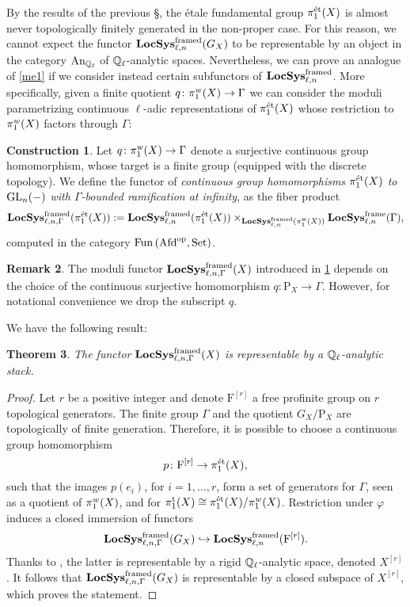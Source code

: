 \documentclass[10pt,a4paper]{amsart}
\numberwithin{equation}{subsection}
\theoremstyle{plain}
\newtheorem{theorem}{Theorem}[section]
\theoremstyle{definition}
\newtheorem{rema}[theorem]{Remark}
\newtheorem{construction}[theorem]{Construction}
\theoremstyle{remark}
\numberwithin{equation}{section}
\begin{document}
By the results of the previous \S, the \'etale fundamental group $\pi_1^{\text{\'et}}(X)$ is almost never topologically finitely generated
in the non-proper case. For this reason, we cannot expect the functor $\mathbf{LocSys}_{\ell, n}^{\mathrm{framed}}(G_X) $ to be representable by an object in the category $\mathrm{An}_{\mathbb{Q}_\ell}$ of $\mathbb{Q}_\ell$-analytic spaces.
Nevertheless,
we can prove an analogue of \cref{me1} if we consider instead certain subfunctors of $\mathbf{LocSys}_{\ell, n}^{\mathrm{framed}}$. More specifically, given a finite
quotient $q \colon \pi_1^w(X) \to \Gamma$ we can consider the moduli parametrizing continuous $\ell$-adic representations of $\pi_1^{\text{\'et}}(X)$
whose restriction to $\pi_1^w(X)$ factors through $\Gamma$:

\begin{construction} \label{const1}
Let $q \colon \mathrm {\pi_1^w}(X) \to \Gamma$ denote a surjective continuous group homomorphism, whose target is a finite group (equipped with the discrete topology). We define the functor of \emph{continuous group homomorphisms $\pi_1^{\text{\'et}}(X)$ to $\mathrm{GL}_n(-)$
with $\Gamma$-bounded ramification at infinity}, as the fiber product
	\begin{equation} \label{eq_def}
		\mathbf{LocSys}_{\ell, n, \Gamma}^{\mathrm{framed}}(\pi_1^{\text{\'et}}(X)): =  \mathbf{LocSys}_{\ell, n}^{\mathrm{framed}}(\pi_1^{\text{\'et}}(X))\times_{  	
		\mathbf{LocSys}_{\ell, n}^{\mathrm{framed}}(\mathrm {\pi_1^w}(X))	}	\mathbf{LocSys}_{\ell, n}^{\mathrm{frame}}(\Gamma),
	\end{equation}
computed in the category $\mathrm{Fun} \left( \mathrm{Afd}^{\mathrm{op}}, \mathrm{Set} \right)$.
\end{construction}

\begin{rema}
The moduli functor $\mathbf{LocSys}_{\ell, n, \Gamma}^{\mathrm{framed}}(X)$ introduced in \cref{const1} depends on the choice of the continuous surjective homomorphism $q \colon
\mathrm P_X \to \Gamma$. However, for notational convenience we drop the subscript $q$.
\end{rema}

We have the following result:

\begin{theorem} \label{hom_loc}
The functor $\mathbf{LocSys}_{\ell, n, \Gamma}^{\mathrm{framed}}(X)$ is representable by a $\mathbb{Q}_{\ell}$-analytic stack.
\end{theorem}

\begin{proof} Let $r$ be a positive integer and denote $\mathrm F^{[r]}$ a free profinite group on $r$ topological generators.
The finite group $\Gamma$ and the quotient $G_X / \mathrm P_X $ are topologically of finite generation. Therefore, it is possible to choose
a continuous group homomorphism 
	\[
		p \colon \mathrm F^{[r]} \to \pi_1^{\text{\'et}}(X),
	\]
such that the images $p(e_i)$, for $i = 1, \dots, r$, form a set of generators for $\Gamma$, seen as a quotient of $\pi_1^w(X)$, and for
$\pi_1^{\mathrm{t}}(X) \cong \pi_1^{\text{\'et}}(X) / \pi_1^w(X)$.
Restriction under $\varphi$ induces a closed immersion of functors 
	\[
		\mathbf{LocSys}_{\ell, n, \Gamma}^{\mathrm{framed}}(G_X) \hookrightarrow \mathbf{LocSys}_{\ell, n}^{\mathrm{framed}}(\mathrm F^{[r]}).
	\]
Thanks to \cite[Theorem
2.2.15.]{me1}, the latter
is representable by a rigid $\mathbb{Q}_\ell$-analytic space, denoted $X^{[r]}$. It follows that $\mathbf{LocSys}_{\ell, n, \Gamma}^{\mathrm{framed}}(G_X)$ is representable by a closed subspace of $X^{[r]}$, which proves the statement.
\end{proof}
\end{document}

